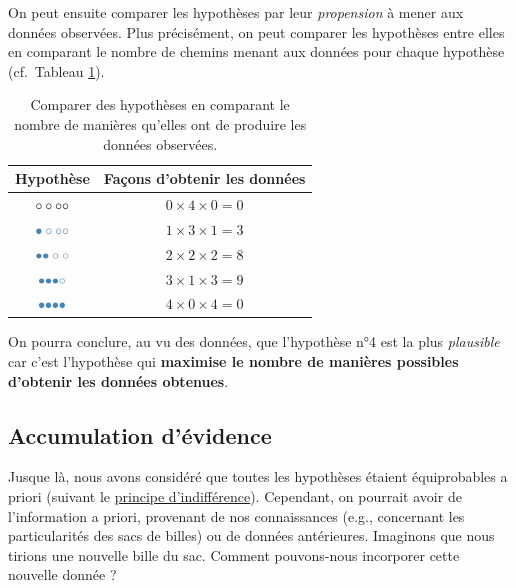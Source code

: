 \documentclass[
  a4paper,11pt,twoside,onecolumn,openright,final,oldfontcommands]{memoir}
\theoremstyle{definition}
\theoremstyle{definition}
\theoremstyle{definition}
\theoremstyle{remark}
\begin{document}
On peut ensuite comparer les hypothèses par leur \emph{propension} à mener aux données observées. Plus précisément, on peut comparer les hypothèses entre elles en comparant le nombre de chemins menant aux données pour chaque hypothèse (cf.~Tableau \ref{tab:hypothesis-comparison}).

\begin{table}[!htb]

\begin{center}
\begin{threeparttable}

\caption{\label{tab:hypothesis-comparison}Comparer des hypothèses en comparant le nombre de manières qu'elles ont de produire les données observées.}

\begin{tabular}{cc}
\toprule
Hypothèse & Façons d'obtenir les données\\
\midrule
$\LARGE \circ \circ \circ \circ$ & $0 \times 4 \times 0 = 0$\\
$\LARGE \color{steelblue}{\bullet} \circ \circ \circ$ & $1 \times 3 \times 1 = 3$\\
$\LARGE \color{steelblue}{\bullet} \color{steelblue}{\bullet} \circ \circ$ & $2 \times 2 \times 2 = 8$\\
$\LARGE \color{steelblue}{\bullet} \color{steelblue}{\bullet} \color{steelblue}{\bullet} \circ$ & $3 \times 1 \times 3 = 9$\\
$\LARGE \color{steelblue}{\bullet} \color{steelblue}{\bullet} \color{steelblue}{\bullet} \color{steelblue}{\bullet}$ & $4 \times 0 \times 4 = 0$\\
\bottomrule
\end{tabular}

\end{threeparttable}
\end{center}

\end{table}

On pourra conclure, au vu des données, que l'hypothèse n°4 est la plus \emph{plausible} car c'est l'hypothèse qui \textbf{maximise le nombre de manières possibles d'obtenir les données obtenues}.

\hypertarget{accumulation-duxe9vidence}{%
\subsection{Accumulation d'évidence}\label{accumulation-duxe9vidence}}

Jusque là, nous avons considéré que toutes les hypothèses étaient équiprobables a priori (suivant le \href{https://en.wikipedia.org/wiki/Principle_of_indifference}{principe d'indifférence}). Cependant, on pourrait avoir de l'information a priori, provenant de nos connaissances (e.g., concernant les particularités des sacs de billes) ou de données antérieures. Imaginons que nous tirions une nouvelle bille du sac. Comment pouvons-nous incorporer cette nouvelle donnée ?
\end{document}
